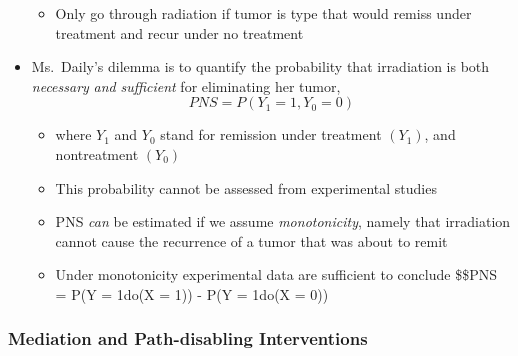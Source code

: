 \documentclass[]{article}
\providecommand{\tightlist}{%
  \setlength{\itemsep}{0pt}\setlength{\parskip}{0pt}}
\begin{document}
\begin{itemize}
  \begin{itemize}
  \tightlist
  \item
    Only go through radiation if tumor is type that would remiss under
    treatment and recur under no treatment
  \end{itemize}
\item
  Ms.~Daily's dilemma is to quantify the probability that irradiation is
  both \emph{necessary} \emph{and} \emph{sufficient} for eliminating her
  tumor, \[PNS = P(Y_1 = 1, Y_0 = 0)\]

  \begin{itemize}
  \tightlist
  \item
    where \(Y_1\) and \(Y_0\) stand for remission under treatment
    \((Y_1)\), and nontreatment \((Y_0)\)
  \item
    This probability cannot be assessed from experimental studies
  \item
    PNS \emph{can} be estimated if we assume \emph{monotonicity}, namely
    that irradiation cannot cause the recurrence of a tumor that was
    about to remit
  \item
    Under monotonicity experimental data are sufficient to conclude
    \$\$PNS = P(Y = 1\textbar{}do(X = 1)) - P(Y = 1\textbar{}do(X = 0))
  \end{itemize}
\end{itemize}

\subsubsection{Mediation and Path-disabling
Interventions}\label{mediation-and-path-disabling-interventions}
\end{document}
